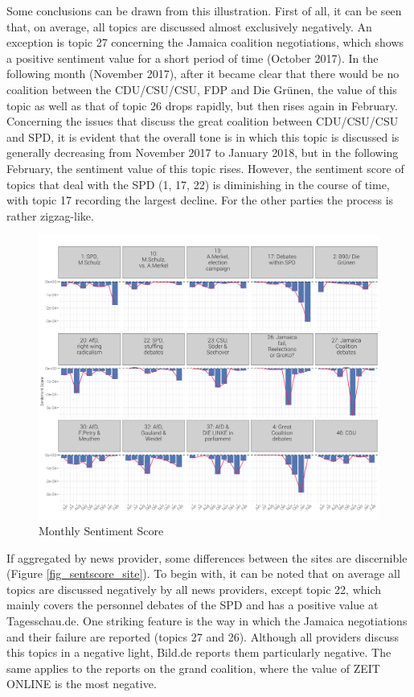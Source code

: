 \documentclass[12pt,a4paper,notitlepage]{article}
\begin{document}
Some conclusions can be drawn from this illustration. First of all, it can be seen that, on average, all topics are discussed almost exclusively negatively. An exception is topic 27 concerning the Jamaica coalition negotiations, which shows a positive sentiment value for a short period of time (October 2017). In the following month (November 2017), after it became clear that there would be no coalition between the CDU/CSU/CSU, FDP and Die Grünen, the value of this topic as well as that of topic 26 drops rapidly, but then rises again in February. Concerning the issues that discuss the great coalition between CDU/CSU/CSU and SPD, it is evident that the overall tone is in which this topic is discussed is generally decreasing from November 2017 to January 2018, but in the following February, the sentiment value of this topic rises. However, the sentiment score of topics that deal with the SPD (1, 17, 22) is diminishing in the course of time, with topic 17 recording the largest decline. For the other parties the process is rather zigzag-like.

\begin{figure}[H]
	\caption{Monthly Sentiment Score}
		\begin{center}
			\includegraphics[width=\textwidth,keepaspectratio]{../figs/sentscore_monthly.png}
		\end{center}
	\label{fig_sentscore_monthly}
\end{figure}

If aggregated by news provider, some differences between the sites are discernible (Figure \ref{fig_sentscore_site}). To begin with, it can be noted that on average all topics are discussed negatively by all news providers, except topic 22, which mainly covers the personnel debates of the SPD and has a positive value at Tagesschau.de. One striking feature is the way in which the Jamaica negotiations and their failure are reported (topics 27 and 26). Although all providers discuss this topics in a negative light, Bild.de reports them particularly negative. The same applies to the reports on the grand coalition, where the value of ZEIT ONLINE is the most negative. 
\end{document}
